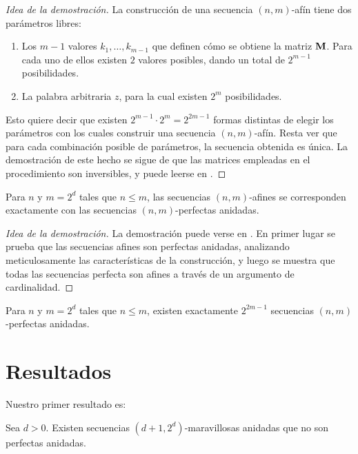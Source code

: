 \documentclass[11pt]{article}
\begin{document}
\begin{proof}[Idea de la demostración]
	La construcción de una secuencia $(n,m)$-afín tiene dos parámetros libres:
	\begin{enumerate}
		\item Los $m - 1$ valores $k_1,\dots,k_{m - 1}$ que definen cómo se
		      obtiene la matriz $\mathbf{M}$. Para cada uno de ellos existen $2$
		      valores posibles, dando un total de $2^{m - 1}$ posibilidades.
		\item La palabra arbitraria $z$, para la cual existen $2^m$
		      posibilidades.
	\end{enumerate}
	Esto quiere decir que existen $2^{m - 1}\cdot2^m = 2^{2m - 1}$
	formas distintas de elegir los parámetros con los cuales construir una
	secuencia $(n,m)$-afín. Resta ver que para cada combinación posible de
	parámetros, la secuencia obtenida es única. La demostración de este hecho se
	sigue de que las matrices empleadas en el procedimiento son inversibles,
	y puede leerse en \cite{BECHER2019101403}.
\end{proof}

\begin{theorem}
	Para $n$ y $m = 2^d$ tales que $n \leq m$, las secuencias $(n,m)$-afines se
	corresponden exactamente con las secuencias $(n,m)$-perfectas anidadas.
\end{theorem}

\begin{proof}[Idea de la demostración]
	La demostración puede verse en \cite{BECHER2019101403}. En primer lugar se
	prueba que las secuencias afines son perfectas anidadas, analizando
	meticulosamente las características de la construcción, y luego se muestra
	que todas las secuencias perfecta son afines a través de un argumento de
	cardinalidad.
\end{proof}

\begin{corollary}
	Para $n$ y $m = 2^d$ tales que $n \leq m$, existen exactamente $2^{2m - 1}$
	secuencias $(n,m)$-perfectas anidadas.
\end{corollary}

\section{Resultados}

Nuestro primer resultado es:

\begin{theorem}
	\label{teo:existencia}
	Sea $d > 0$. Existen secuencias $(d + 1, 2^d)$-maravillosas anidadas que no son perfectas anidadas.
\end{theorem}
\end{document}
